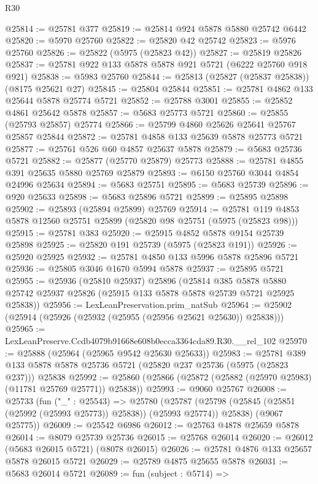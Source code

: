 \begin{lexlean}{R30}
\begin{coremodule}
@25814 := @25781 @377
@25819 := @25814 @924 @5878 @5880 @25742 @6442
@25820 := @5970 @25760
@25822 := @25820 @42 @25742
@25823 := @5976 @25760
@25826 := @25822 (@5975 (@25823 @42))
@25827 := @25819 @25826
@25837 := @25781 @922 @133 @5878 @5878 @921 @5721 (@6222 @25760 @918 @921)
@25838 := @5983 @25760
@25844 := @25813 (@25827 (@25837 @25838)) (@8175 @25621 @27)
@25845 := @25804 @25844
@25851 := @25781 @4862 @133 @25644 @5878 @25774 @5721
@25852 := @25788 @3001
@25855 := @25852 @4861 @25642 @5878
@25857 := @5683 @25773 @5721
@25860 := @25855 (@25793 @25857) @25774
@25866 := @25799 @4860 @25626 @25641 @25767 @25857 @25844
@25872 := @25781 @4858 @133 @25639 @5878 @25773 @5721
@25877 := @25761 @526 @60 @4857 @25637 @5878
@25879 := @5683 @25736 @5721
@25882 := @25877 (@25770 @25879) @25773
@25888 := @25781 @4855 @391 @25635 @5880 @25769 @25879
@25893 := @6150 @25760 @3044 @4854 @24996 @25634
@25894 := @5683 @25751
@25895 := @5683 @25739
@25896 := @920 @25633
@25898 := @5683 @25896 @5721
@25899 := @25895 @25898
@25902 := @25893 (@25894 @25899) @25769
@25914 := @25781 @119 @4853 @5878 @12560 @25751 @25899 (@25820 @98 @25751 (@5975 (@25823 @98)))
@25915 := @25781 @383
@25920 := @25915 @4852 @5878 @9154 @25739 @25898
@25925 := @25820 @191 @25739 (@5975 (@25823 @191))
@25926 := @25920 @25925
@25932 := @25781 @4850 @133 @5996 @5878 @25896 @5721
@25936 := @25805 @3046 @1670 @5994 @5878
@25937 := @25895 @5721
@25955 := @25936
    (@25810 @25937)
    @25896
    (@25814
      @385
      @5878
      @5880
      @25742
      @25937
      @25826
      (@25915 @133 @5878 @5878 @25739 @5721 @25925 @25838))
@25956 := LexLeanPreservation.prim_natSub
@25964 := @25902 (@25914 (@25926 (@25932 (@25955 (@25956 @25621 @25630)) @25838)))
@25965 := LexLeanPreserve.Ccdb4079b91668e608b0ecca3364cda89.R30.__rel_102
@25970 := @25888 (@25964 (@25965 @9542 @25630 @25633))
@25983 := @25781
    @389
    @133
    @5878
    @5878
    @25736
    @5721
    (@25820 @237 @25736 (@5975 (@25823 @237)))
    @25838
@25992 := @25860 (@25866 (@25872 (@25882 (@25970 @25983) (@11781 @25769 @25771)) @25838))
@25993 := @9060 @25767
@26008 := @25733
    (fun ("_" : @25543) =>
    @25780
      (@25787 (@25798 (@25845 (@25851 (@25992 (@25993 @25773)) @25838)) (@25993 @25774)) @25838)
      (@9067 @25775))
@26009 := @25542 @6986
@26012 := @25763 @4878 @25659 @5878
@26014 := @8079 @25739 @25736
@26015 := @25768 @26014
@26020 := @26012 (@5683 @26015 @5721) (@8078 @26015)
@26026 := @25781 @4876 @133 @25657 @5878 @26015 @5721
@26029 := @25789 @4875 @25655 @5878
@26031 := @5683 @26014 @5721
@26089 := fun (subject : @5714) =>

\end{coremodule}
\end{lexlean}

